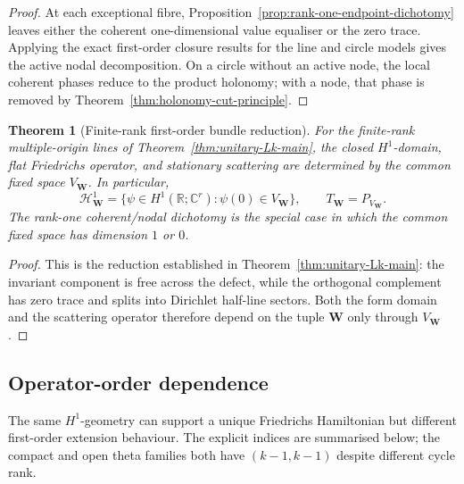 \documentclass[11pt]{article}
\theoremstyle{plain}
\newtheorem{theorem}{Theorem}[section]
\theoremstyle{definition}
\begin{document}
\begin{proof}
At each exceptional fibre,
Proposition~\ref{prop:rank-one-endpoint-dichotomy} leaves either the coherent
one-dimensional value equaliser or the zero trace. Applying the exact
first-order closure results for the line and circle models gives the active
nodal decomposition. On a circle without an active node, the local coherent
phases reduce to the product holonomy; with a node, that phase is removed by
Theorem~\ref{thm:holonomy-cut-principle}.
\end{proof}



\begin{theorem}[Finite-rank first-order bundle reduction]
\label{thm:finite-rank-H1-bundle-reduction}
For the finite-rank multiple-origin lines of
Theorem~\ref{thm:unitary-Lk-main}, the closed \(H^1\)-domain, flat
Friedrichs operator, and stationary scattering are determined by the common
fixed space \(V_{\mathbf W}\). In particular,
\[
  \mathcal H_{\mathbf W}^1
  =
  \{\psi\in H^1(\mathbb R;\mathbb C^r):\psi(0)\in V_{\mathbf W}\},
  \qquad
  T_{\mathbf W}=P_{V_{\mathbf W}}.
\]
The rank-one coherent/nodal dichotomy is the special case in which the
common fixed space has dimension \(1\) or \(0\).
\end{theorem}

\begin{proof}
This is the reduction established in
Theorem~\ref{thm:unitary-Lk-main}: the invariant component is free across the
defect, while the orthogonal complement has zero trace and splits into
Dirichlet half-line sectors. Both the form domain and the scattering operator
therefore depend on the tuple \(\mathbf W\) only through
\(V_{\mathbf W}\).
\end{proof}

\subsection{Operator-order dependence}
\label{subsec:detectability-operator-order}

The same \(H^1\)-geometry can support a unique Friedrichs Hamiltonian but different first-order extension behaviour. The explicit indices are summarised below; the compact and open theta families both have \((k-1,k-1)\) despite different cycle rank.
\end{document}
